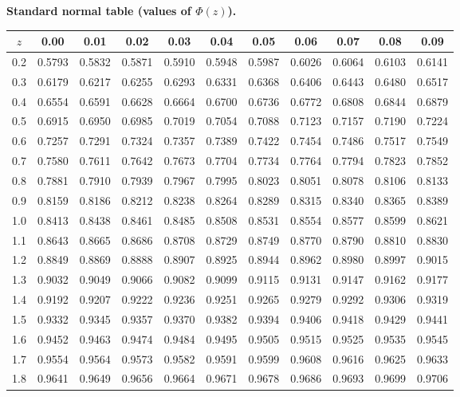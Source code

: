 \noindent\textbf{Standard normal table (values of \(\Phi(z)\)).}
\begin{center}\footnotesize
	\begin{tabular}{c|cccccccccc}
		\(z\) & 0.00 & 0.01 & 0.02 & 0.03 & 0.04 & 0.05 & 0.06 & 0.07 & 0.08 & 0.09\\\hline
		0.2 & 0.5793 & 0.5832 & 0.5871 & 0.5910 & 0.5948 & 0.5987 & 0.6026 & 0.6064 & 0.6103 & 0.6141\\
		0.3 & 0.6179 & 0.6217 & 0.6255 & 0.6293 & 0.6331 & 0.6368 & 0.6406 & 0.6443 & 0.6480 & 0.6517\\
		0.4 & 0.6554 & 0.6591 & 0.6628 & 0.6664 & 0.6700 & 0.6736 & 0.6772 & 0.6808 & 0.6844 & 0.6879\\
		0.5 & 0.6915 & 0.6950 & 0.6985 & 0.7019 & 0.7054 & 0.7088 & 0.7123 & 0.7157 & 0.7190 & 0.7224\\
		0.6 & 0.7257 & 0.7291 & 0.7324 & 0.7357 & 0.7389 & 0.7422 & 0.7454 & 0.7486 & 0.7517 & 0.7549\\
		0.7 & 0.7580 & 0.7611 & 0.7642 & 0.7673 & 0.7704 & 0.7734 & 0.7764 & 0.7794 & 0.7823 & 0.7852\\
		0.8 & 0.7881 & 0.7910 & 0.7939 & 0.7967 & 0.7995 & 0.8023 & 0.8051 & 0.8078 & 0.8106 & 0.8133\\
		0.9 & 0.8159 & 0.8186 & 0.8212 & 0.8238 & 0.8264 & 0.8289 & 0.8315 & 0.8340 & 0.8365 & 0.8389\\
		1.0 & 0.8413 & 0.8438 & 0.8461 & 0.8485 & 0.8508 & 0.8531 & 0.8554 & 0.8577 & 0.8599 & 0.8621\\
		1.1 & 0.8643 & 0.8665 & 0.8686 & 0.8708 & 0.8729 & 0.8749 & 0.8770 & 0.8790 & 0.8810 & 0.8830\\
		1.2 & 0.8849 & 0.8869 & 0.8888 & 0.8907 & 0.8925 & 0.8944 & 0.8962 & 0.8980 & 0.8997 & 0.9015\\
		1.3 & 0.9032 & 0.9049 & 0.9066 & 0.9082 & 0.9099 & 0.9115 & 0.9131 & 0.9147 & 0.9162 & 0.9177\\
		1.4 & 0.9192 & 0.9207 & 0.9222 & 0.9236 & 0.9251 & 0.9265 & 0.9279 & 0.9292 & 0.9306 & 0.9319\\
		1.5 & 0.9332 & 0.9345 & 0.9357 & 0.9370 & 0.9382 & 0.9394 & 0.9406 & 0.9418 & 0.9429 & 0.9441\\
		1.6 & 0.9452 & 0.9463 & 0.9474 & 0.9484 & 0.9495 & 0.9505 & 0.9515 & 0.9525 & 0.9535 & 0.9545\\
		1.7 & 0.9554 & 0.9564 & 0.9573 & 0.9582 & 0.9591 & 0.9599 & 0.9608 & 0.9616 & 0.9625 & 0.9633\\
		1.8 & 0.9641 & 0.9649 & 0.9656 & 0.9664 & 0.9671 & 0.9678 & 0.9686 & 0.9693 & 0.9699 & 0.9706\\

\end{tabular}
\end{center}
